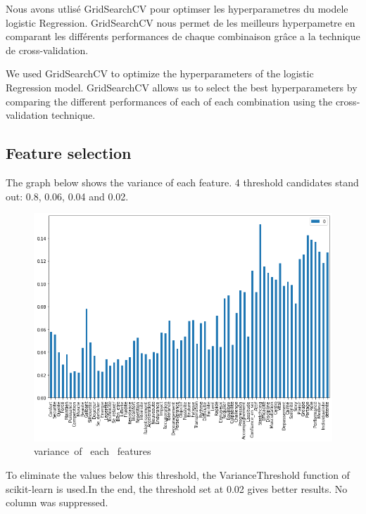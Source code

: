 \documentclass[12pt]{article}
\begin{document}
\vspace{0.2 cm}

Nous avons utlisé  GridSearchCV pour optimser les hyperparametres du modele  logistic Regression. 
GridSearchCV nous permet de les meilleurs hyperpametre en comparant les différents performances 
 de chaque combinaison grâce a la technique de cross-validation.
 
\vspace{0.2 cm}

We used GridSearchCV to optimize the hyperparameters of the logistic Regression model. 
GridSearchCV allows us to select the best hyperparameters by comparing the different performances of each 
 of each combination using the cross-validation technique.

  
\subsection{Feature selection} 


\noindent The graph below shows the variance of each feature. 
 4 threshold candidates stand out: 0.8, 0.06, 0.04 and 0.02.



\begin{figure}[H]
\begin{center}
\includegraphics[scale=0.6]{barlot.png}
\caption[]{ variance\ of \ each \ features}
\end{center}
\end{figure}

\noindent To eliminate the values below this threshold, the VarianceThreshold function of scikit-learn is used.In the end, the threshold set at 0.02 gives better results. No column was suppressed. 
\end{document}

